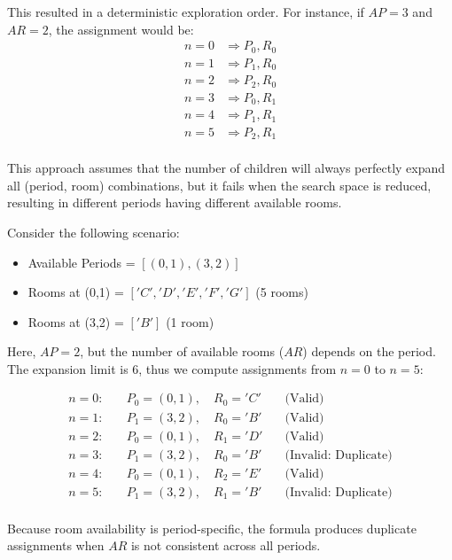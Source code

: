 This resulted in a deterministic exploration order. For instance, if \(AP = 3\) and \(AR = 2\), the assignment would be:
\[
\begin{aligned}
n = 0 &\Rightarrow P_0, R_0 \\
n = 1 &\Rightarrow P_1, R_0 \\
n = 2 &\Rightarrow P_2, R_0 \\
n = 3 &\Rightarrow P_0, R_1 \\
n = 4 &\Rightarrow P_1, R_1 \\
n = 5 &\Rightarrow P_2, R_1 \\
\end{aligned}
\]

This approach assumes that the number of children will always perfectly expand all (period, room) combinations, but it fails when the search space is reduced, resulting in different periods having different available rooms.

Consider the following scenario:
\begin{itemize}
\item Available Periods = \([(0,1), (3,2)]\)
\item Rooms at (0,1) = \(['C', 'D', 'E', 'F', 'G']\) (5 rooms)
\item Rooms at (3,2) = \(['B']\) (1 room)
\end{itemize}

Here, \(AP = 2\), but the number of available rooms (\(AR\)) depends on the period. The expansion limit is 6, thus we compute assignments from \(n = 0\) to \(n = 5\):

\[
\begin{aligned}
n = 0: &\quad P_0 = (0,1),\quad R_0 = 'C' \quad &\text{(Valid)} \\
n = 1: &\quad P_1 = (3,2),\quad R_0 = 'B' \quad &\text{(Valid)} \\
n = 2: &\quad P_0 = (0,1),\quad R_1 = 'D' \quad &\text{(Valid)} \\
n = 3: &\quad P_1 = (3,2),\quad R_0 = 'B' \quad &\text{(Invalid: Duplicate)} \\
n = 4: &\quad P_0 = (0,1),\quad R_2 = 'E' \quad &\text{(Valid)} \\
n = 5: &\quad P_1 = (3,2),\quad R_1 = 'B' \quad &\text{(Invalid: Duplicate)} \\
\end{aligned}
\]

Because room availability is period-specific, the formula produces duplicate assignments when \(AR\) is not consistent across all periods.

